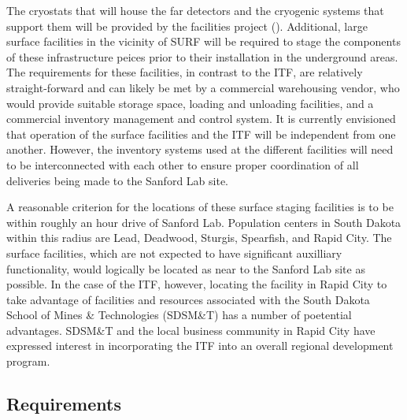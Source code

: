 The cryostats that will house the far detectors and the cryogenic systems 
that support them will be provided by the facilities project ().
Additional, large surface facilities in the vicinity of SURF will be 
required to stage the components of these infrastructure peices prior to 
their installation in the underground areas.  The requirements for these
facilities, in contrast to the ITF, are relatively straight-forward and 
can likely be met by a commercial warehousing vendor, who would provide 
suitable storage space, loading and unloading facilities, and a commercial 
inventory management and control system.  It is currently envisioned that 
operation of the  surface facilities and the  ITF 
will be independent from one another.  However, the inventory systems used 
at the different facilities will need to be interconnected with each other 
to ensure proper coordination of all deliveries being made to the Sanford 
Lab site.

A reasonable criterion for the locations of these surface staging facilities 
is to be within roughly an hour drive of Sanford Lab.  Population centers 
in South Dakota within this radius are Lead, Deadwood, Sturgis, Spearfish, 
and Rapid City.  The  surface facilities, which are not expected 
to have significant auxilliary functionality, would logically be located as 
near to the Sanford Lab site as possible.  In the case of the  
ITF, however, locating the facility in Rapid City to take advantage of 
facilities and resources associated with the South Dakota School of Mines 
\& Technologies (SDSM\&T) has a number of poetential advantages.  SDSM\&T 
and the local business community in Rapid City have expressed interest in 
incorporating the  ITF into an overall regional development 
program.     

\subsection{Requirements}

